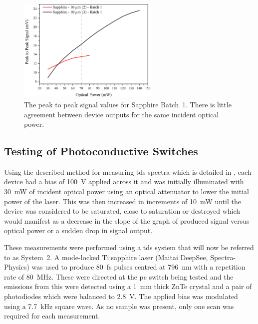 \begin{figure}[h!]
    \centering
    \includegraphics[width=0.6\textwidth]{Figures/Misc/SysDev/Opt10MicronBatch1.png}
    \captionsetup{font = footnotesize, justification = centering}
    \caption[The Peak to Peak Signal Values for Sapphire Batch~1]{The peak to peak signal values for Sapphire Batch~1. There is little agreement between device outputs for the same incident optical power.}
    \label{fig:sapphbatch1}
\end{figure}

\subsection{Testing of Photoconductive Switches}
Using the described method for measuring \acrshort{tds} spectra which is detailed in , each device had a bias of \SI{100}{V} applied across it and was initially illuminated with \SI{30}{mW} of incident optical power using an optical attenuator to lower the initial power of the laser. This was then increased in increments of \SI{10}{mW} until the device was considered to be saturated, close to saturation or destroyed which would manifest as a decrease in the slope of the graph of produced signal versus optical power or a sudden drop in signal output. 

These measurements were performed using a \acrshort{tds} system that will now be referred to as System~2. A mode\nobreakdash-locked Ti:sapphire laser (Maitai DeepSee, Spectra\nobreakdash-Physics) was used to produce \SI{80}{fs} pulses centred at \SI{796}{nm} with a repetition rate of \SI{80}{MHz}. These were directed at the \acrshort{pc} switch being tested and the emissions from this were detected using a \SI{1}{mm} thick ZnTe crystal and a pair of photodiodes which were balanced to \SI{2.8}{V}. The applied bias was modulated using a \SI{7.7}{kHz} square wave. As no sample was present, only one scan was required for each measurement.

